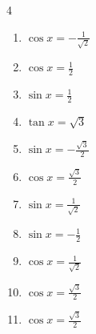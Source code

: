 \begin{multicols}{4}
\begin{enumerate}
  \item $\displaystyle \cos{x}  = -\frac{1}{\sqrt{2}}$


  \item $\displaystyle \cos{x}  = \frac{1}{2}$


  \item $\displaystyle \sin{x}  = \frac{1}{2}$


  \item $\displaystyle \tan{x}  = \sqrt{3}$


  \item $\displaystyle \sin{x}  = -\frac{\sqrt{3}}{2}$


  \item $\displaystyle \cos{x}  = \frac{\sqrt{3}}{2}$


  \item $\displaystyle \sin{x}  = \frac{1}{\sqrt{2}}$


  \item $\displaystyle \sin{x}  = -\frac{1}{2}$


  \item $\displaystyle \cos{x}  = \frac{1}{\sqrt{2}}$


  \item $\displaystyle \cos{x}  = \frac{\sqrt{3}}{2}$


  \item $\displaystyle \cos{x}  = \frac{\sqrt{3}}{2}$



\end{enumerate}
\end{multicols}
